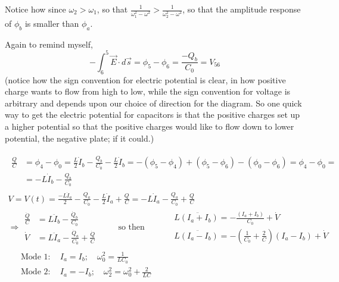 \documentclass[twoside,10pt]{amsart}
\newcommand{\problemhead}[1]
  {\smallskip
   \noindent{\large\bf Problem #1.}
   \smallskip}
\begin{document}
Notice how since $\omega_2 > \omega_1$, so that $\frac{1}{ \omega_1^2 - \omega^2 } > \frac{1}{ \omega_2^2 - \omega^2 }$, so that the amplitude response of $\phi_b$ is smaller than $\phi_a$.  

\problemhead{3.29} Again to remind myself,
\[
-\int_6^5 \vec{E} \cdot d\vec{s} = \phi_5 - \phi_6 = \frac{-Q_b}{C_0}  = V_{56}
\]
(notice how the sign convention for electric potential is clear, in how positive charge wants to flow from high to low, while the sign convention for voltage is arbitrary and depends upon our choice of direction for the diagram.  So one quick way to get the electric potential for capacitors is that the positive charges set up a higher potential so that the positive charges would like to flow down to lower potential, the negative plate; if it could.)

\[
\begin{gathered}
  \begin{aligned}
  \frac{Q}{C} & = \phi_4 - \phi_0 = \frac{L}{2} \dot{I}_b - \frac{Q_b}{C_0} - \frac{L}{2} \dot{I}_b = -(\phi_5 - \phi_4) + (\phi_5 - \phi_6)  - (\phi_0 - \phi_6) = \phi_4 - \phi_0 = \\
  &  = - L \dot{I}_b - \frac{Q_b}{C_0} 
  \end{aligned} \\
  V  = V(t) = \frac{ -L \dot{I}_a}{2 } - \frac{ Q_a}{C_0} - \frac{L}{2} \dot{I}_a + \frac{Q}{C} = -L\dot{I}_a - \frac{Q_a}{C_0} + \frac{Q}{C} \\
  \Longrightarrow \begin{aligned}
    \frac{ \dot{Q}}{C} & =  L \ddot{I}_b - \frac{ \dot{Q}_b}{ C_0 } \\
    \dot{V} & = L \ddot{I}_a - \frac{ \dot{Q}_a}{ C_0 } + \frac{ \dot{Q}}{C} 
\end{aligned} \quad \quad \text{ so then } \quad \quad 
\begin{aligned}
  & L \ddot{ ( I_a + I_b ) } = - \frac{ (I_a + I_b) }{ C_0 } + \dot{V} \\
  & L \ddot{ (I_a - I_b)  } = - \left( \frac{1}{C_0} + \frac{2}{C} \right) (I_a - I_b) + \dot{V}
\end{aligned} \\
\begin{aligned}
  & \text{ Mode } 1: \quad I_a = I_b; \quad \omega_0^2 = \frac{1}{LC_0} \\ 
  & \text{ Mode } 2:  \quad I_a = -I_b ; \quad \omega_2^2  = \omega_0^2 + \frac{2}{LC}
\end{aligned}
\end{gathered}
\]
\end{document}
